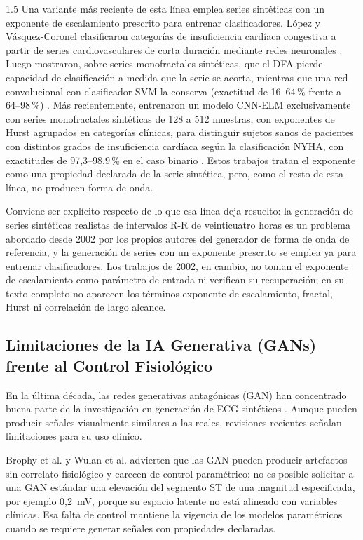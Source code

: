 \begin{spacing}{1.5}
Una variante más reciente de esta línea emplea series sintéticas con un exponente de escalamiento prescrito para entrenar clasificadores. López y Vásquez-Coronel clasificaron categorías de insuficiencia cardíaca congestiva a partir de series cardiovasculares de corta duración mediante redes neuronales \cite{lopez2023congestive}. Luego mostraron, sobre series monofractales sintéticas, que el DFA pierde capacidad de clasificación a medida que la serie se acorta, mientras que una red convolucional con clasificador SVM la conserva (exactitud de 16--64\,\% frente a 64--98\,\%) \cite{lopez2024monofractal}. Más recientemente, entrenaron un modelo CNN-ELM exclusivamente con series monofractales sintéticas de 128 a 512 muestras, con exponentes de Hurst agrupados en categorías clínicas, para distinguir sujetos sanos de pacientes con distintos grados de insuficiencia cardíaca según la clasificación NYHA, con exactitudes de 97,3--98,9\,\% en el caso binario \cite{lopez2025monofractal}. Estos trabajos tratan el exponente como una propiedad declarada de la serie sintética, pero, como el resto de esta línea, no producen forma de onda.

Conviene ser explícito respecto de lo que esa línea deja resuelto: la generación de series sintéticas realistas de intervalos R-R de veinticuatro horas es un problema abordado desde 2002 por los propios autores del generador de forma de onda de referencia, y la generación de series con un exponente prescrito se emplea ya para entrenar clasificadores. Los trabajos de 2002, en cambio, no toman el exponente de escalamiento como parámetro de entrada ni verifican su recuperación; en su texto completo no aparecen los términos exponente de escalamiento, fractal, Hurst ni correlación de largo alcance.

\subsection{Limitaciones de la IA Generativa (GANs) frente al Control Fisiológico}

En la última década, las redes generativas antagónicas (GAN) han concentrado buena parte de la investigación en generación de ECG sintéticos \cite{wulan2020generating}. Aunque pueden producir señales visualmente similares a las reales, revisiones recientes señalan limitaciones para su uso clínico.

Brophy et al. \cite{brophy2023generative} y Wulan et al. \cite{wulan2020generating} advierten que las GAN pueden producir artefactos sin correlato fisiológico y carecen de control paramétrico: no es posible solicitar a una GAN estándar una elevación del segmento ST de una magnitud especificada, por ejemplo 0,2~mV, porque su espacio latente no está alineado con variables clínicas. Esa falta de control mantiene la vigencia de los modelos paramétricos cuando se requiere generar señales con propiedades declaradas.


\end{spacing}
